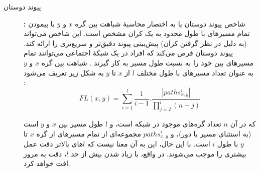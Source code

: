 \begin{description}
\item[پیوند دوستان]\textbf{:}
شاخص پیوند دوستان یا به اختصار  محاسبهٔ شباهت بین گره $x$ و $y$ با پیمودن تمام مسیرهای با طول محدود به یک کران مشخص است. این شاخص می‌تواند (به دلیل در نظر گرفتن کران) پیش‌بینی پیوند دقیق‌تر و سریع‌تری را ارائه کند. پیوند دوستان فرض می‌کند که افراد در یک شبکهٔ اجتماعی می‌توانند تمام مسیرهای بین خود را به نسبت  طول مسیر به کار گیرند \cite{papadimitriou2012fast}. شباهت بین گره $x$ و $y$ به عنوان تعداد مسیرهای با طول مختلف $l$ از $x$ تا $y$ به شکل  زیر تعریف می‌شود : 
\begin{equation}
FL(x,y) = \sum^{l}_{i=1} \frac{1}{i-1}.\frac{|paths^{i}_{x,y}|}{\prod^{i}_{j=2}(n-j)}
\end{equation}
 
 که در آن $n$ تعداد گره‌های موجود در شبکه است، و $l$ طول مسیر بین $x$ و $y$ است (به استثنای مسیر با دور)، و $paths^{i}_{x,y}$ مجموعه‌ای از تمام مسیرهای از گره $x$ تا $y$ با طول $i$ است. با این حال، این به آن معنا نیست که $l$های بالاتر دقت عمل بیشتری را موجب می‌شوند. در واقع، با زیاد شدن بیش از حد $l$، دقت به مرور افت خواهد کرد.
\end{description}
